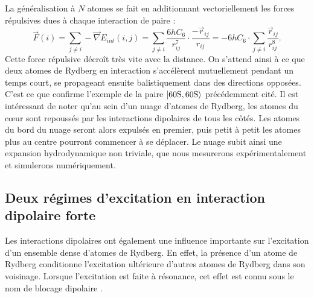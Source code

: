 La généralisation à $N$ atomes se fait en additionnant vectoriellement les forces répulsives dues à chaque interaction de paire :
\begin{equation}
\label{eq:repuls_Natomes}
\vec{F}(i) =  \sum_{j\neq i} -\vec{\nabla}E_{int}(i,j)
= \sum_{j\neq i} \frac{6hC_6}{r_{ij}^7} \cdot \frac{-\vec{r}_{ij}}{r_{ij}}
= - 6hC_6 \cdot \sum_{j\neq i} \frac{\vec{r}_{ij}}{r_{ij}^8}.
\end{equation}
%
Cette force répulsive décroît très vite avec la distance.
On s'attend ainsi à ce que deux atomes de Rydberg en interaction s'accélèrent mutuellement pendant un temps court, se propageant ensuite balistiquement dans des directions opposées.
C'est ce que confirme l'exemple de la paire $\ket{\mathrm{60S,60S}}$ précédemment cité.
Il est intéressant de noter qu'au sein d'un nuage d'atomes de Rydberg, les atomes du c\oe ur  sont repoussés par les interactions dipolaires de tous les côtés.
Les atomes du bord du nuage seront alors expulsés en premier, puis petit à petit les atomes plus au centre pourront commencer à se déplacer.
Le nuage subit ainsi une expansion hydrodynamique non triviale, que nous mesurerons expérimentalement et simulerons numériquement.

	\subsection{Deux régimes d'excitation en interaction dipolaire forte}\label{subsec:excitation_bloc_facil}

\noindent Les interactions dipolaires ont également une influence importante sur l'excitation d'un ensemble dense d'atomes de Rydberg.	
En effet, la présence d'un atome de Rydberg conditionne l'excitation ultérieure d'autres atomes de Rydberg dans son voisinage.
Lorsque l'excitation est faite à résonance, cet effet est connu sous le nom de \og blocage dipolaire \fg{}.

